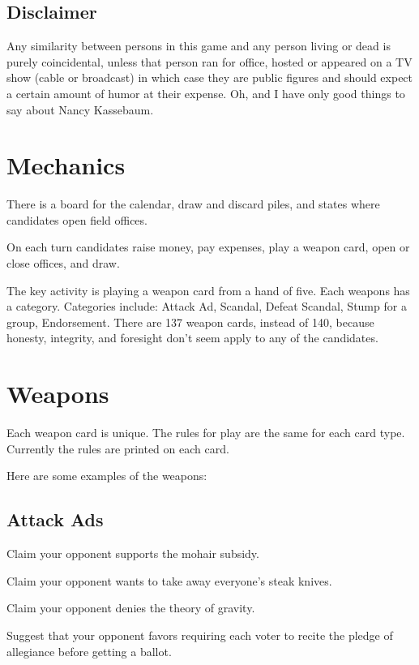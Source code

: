\documentclass[twocolumn]{article}
\begin{document}
\subsection{Disclaimer}

Any similarity between persons in this game and any person living or dead is purely coincidental, unless that person ran for office, hosted or appeared on a TV show
(cable or broadcast) in which case they are public figures and should expect a certain amount of humor at their expense. Oh, and I have only good things to say about Nancy Kassebaum.

\section{Mechanics}

There is a board for the calendar, draw and discard piles, and states where candidates open field offices.

On each turn candidates raise money, pay expenses, play a weapon card, open or close offices, and draw.

The key activity is playing a weapon card from a hand of five. Each weapons has a category. Categories include: Attack Ad, Scandal, Defeat Scandal, Stump for a group, Endorsement.
There are 137 weapon cards, instead of 140, because honesty, integrity, and foresight don't seem apply to any of the candidates.

\section{Weapons}

Each weapon card is unique. The rules for play are the same for each card type. Currently the rules are printed on each card.

Here are some examples of the weapons:

\subsection{Attack Ads}

Claim your opponent supports the mohair subsidy.

Claim your opponent wants to take away everyone's steak knives.

Claim your opponent denies the theory of gravity.

Suggest that your opponent favors requiring each voter to recite the pledge of allegiance before getting a ballot.
\end{document}
